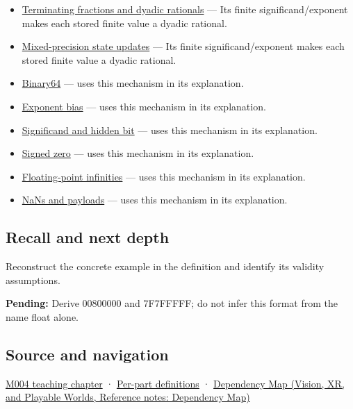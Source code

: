 \begin{itemize}
\item
  \hyperref[appendix-2a2f1b74bdd3]{Terminating fractions and dyadic rationals} --- Its finite significand/exponent makes each stored finite value a dyadic rational.
\item
  \hyperref[appendix-260182e617b7]{Mixed-precision state updates} --- Its finite significand/exponent makes each stored finite value a dyadic rational.
\item
  \hyperref[appendix-5078dfab64e6]{Binary64} --- uses this mechanism in its explanation.
\item
  \hyperref[appendix-2fae058c82e1]{Exponent bias} --- uses this mechanism in its explanation.
\item
  \hyperref[appendix-a24fd710cf67]{Significand and hidden bit} --- uses this mechanism in its explanation.
\item
  \hyperref[appendix-3a048f032c1f]{Signed zero} --- uses this mechanism in its explanation.
\item
  \hyperref[appendix-eb336149c00a]{Floating-point infinities} --- uses this mechanism in its explanation.
\item
  \hyperref[appendix-d6607cc4c235]{NaNs and payloads} --- uses this mechanism in its explanation.
\end{itemize}

\subsection{Recall and next depth}\label{appendix-5057f9ad327f-recall-and-next-depth}

\hypertarget{appendix-5057f9ad327f-recall-and-next-depth}{}

Reconstruct the concrete example in the definition and identify its validity assumptions.

\textbf{Pending:} Derive 00800000 and 7F7FFFFF; do not infer this format from the name float alone.

\subsection{Source and navigation}\label{appendix-5057f9ad327f-source-and-navigation}

\hypertarget{appendix-5057f9ad327f-source-and-navigation}{}

\hyperref[01-foundations-i-ch001-a-stretching-ruler-for-real-valued-quantities]{M004 teaching chapter} · \hyperref[appendix-fd090d982a15-m004---parts-61-76]{Per-part definitions} · \href{../07-Vision-XR-and-Playable-Worlds/main.pdf\#nameddest=appendix-4ad47bdd269a}{Dependency Map (Vision, XR, and Playable Worlds, Reference notes: Dependency Map)}
